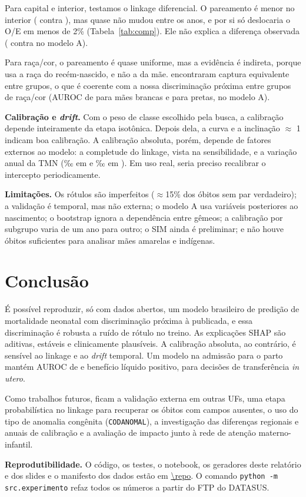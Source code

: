 \documentclass[12pt]{article}
\begin{document}
Para capital e interior, testamos o linkage diferencial. O pareamento é menor no interior (\linkInt{} contra \linkCap{}), mas quase não mudou entre os anos, e por si só deslocaria o O/E em menos de 2\% (Tabela~\ref{tab:comp}). Ele não explica a diferença observada (\oeRegACapCal{} contra \oeRegAIntCal{} no modelo A).

Para raça/cor, o pareamento é quase uniforme, mas a evidência é indireta, porque usa a raça do recém-nascido, e não a da mãe. \cite{ramos2025} encontraram captura equivalente entre grupos, o que é coerente com a nossa discriminação próxima entre grupos de raça/cor (AUROC de \subABrancaAuroc{} para mães brancas e \subAPretaAuroc{} para pretas, no modelo A).

\textbf{Calibração e \emph{drift}.} Com o peso de classe escolhido pela busca, a calibração depende inteiramente da etapa isotônica. Depois dela, a curva e a inclinação $\approx$ 1 indicam boa calibração. A calibração absoluta, porém, depende de fatores externos ao modelo: a completude do linkage, vista na sensibilidade, e a variação anual da TMN (\tmnValid{}‰ em \anoValid{} e \tmnTeste{}‰ em \anoTeste{}). Em uso real, seria preciso recalibrar o intercepto periodicamente.

\textbf{Limitações.} Os rótulos são imperfeitos ($\approx$15\% dos óbitos sem par verdadeiro); a validação é temporal, mas não externa; o modelo A usa variáveis posteriores ao nascimento; o bootstrap ignora a dependência entre gêmeos; a calibração por subgrupo varia de um ano para outro; o SIM \anoObFim{} ainda é preliminar; e não houve óbitos suficientes para analisar mães amarelas e indígenas.

\section{Conclusão}

É possível reproduzir, só com dados abertos, um modelo brasileiro de predição de mortalidade neonatal com discriminação próxima à publicada, e essa discriminação é robusta a ruído de rótulo no treino. As explicações SHAP são aditivas, estáveis e clinicamente plausíveis. A calibração absoluta, ao contrário, é sensível ao linkage e ao \emph{drift} temporal. Um modelo na admissão para o parto mantém AUROC de \BXgbAuroc{} e benefício líquido positivo, para decisões de transferência \emph{in utero}.

Como trabalhos futuros, ficam a validação externa em outras UFs, uma etapa probabilística no linkage para recuperar os óbitos com campos ausentes, o uso do tipo de anomalia congênita (\texttt{CODANOMAL}), a investigação das diferenças regionais e anuais de calibração e a avaliação de impacto junto à rede de atenção materno-infantil.

\textbf{Reprodutibilidade.} O código, os testes, o notebook, os geradores deste relatório e dos slides e o manifesto dos dados estão em \url{\repo}. O comando \texttt{python -m src.experimento} refaz todos os números a partir do FTP do DATASUS.



\end{document}
